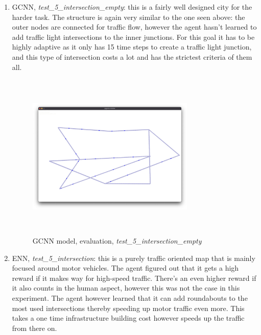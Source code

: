 \documentclass[
]{elteikthesis}[2023/04/10]
\begin{document}
\begin{enumerate}
\begin{figure}[H]
\end{figure}
\item GCNN, \emph{test\_5\_intersection\_empty}: this is a fairly well designed
city for the harder task. The structure is again very similar to the
one seen above: the outer nodes are connected for traffic flow, however
the agent hasn't learned to add traffic light intersections to the
inner junctions. For this goal it has to be highly adaptive as it
only has 15 time steps to create a traffic light junction, and this
type of intersection costs a lot and has the strictest criteria of
them all. 
\begin{figure}[H]
\begin{centering}
\includegraphics[width=8cm,height=8cm,keepaspectratio]{images/city_agent_gcnn_2023-04-29_18-06_test_5_intersection_empty}
\par\end{centering}
\caption{GCNN model, evaluation, \emph{test\_5\_intersection\_empty}}
\end{figure}
\item ENN, \emph{test\_5\_intersection}: this is a purely traffic oriented
map that is mainly focused around motor vehicles. The agent figured
out that it gets a high reward if it makes way for high-speed traffic.
There's an even higher reward if it also counts in the human aspect,
however this was not the case in this experiment. The agent however
learned that it can add roundabouts to the most used intersections
thereby speeding up motor traffic even more. This takes a one time
infrastructure building cost however speeds up the traffic from there
on. 
\begin{figure}[H]
\begin{centering}

\end{centering}
\end{figure}
\end{enumerate}
\end{document}
